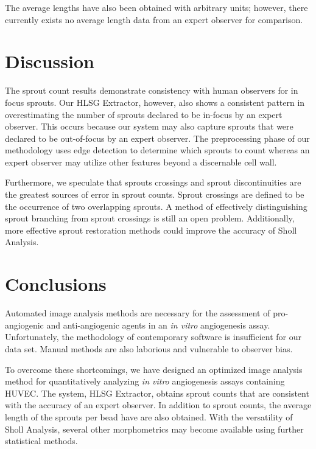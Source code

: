 \documentclass{sig-alternate}
\newcommand{\invitro}{\emph{in vitro} }
\begin{document}
	The average lengths have also been obtained with arbitrary units;
	however, there currently exists no average length data from an expert
	observer for comparison.

\section{Discussion} %
\label{sec:Discussion}
	The sprout count results demonstrate consistency with human observers
	for in focus sprouts. Our HLSG Extractor, however, also shows a
	consistent pattern in overestimating the number of sprouts
	declared to be in-focus by an expert observer. This occurs because
	our system may also capture sprouts that were declared to be
	out-of-focus by an expert observer. The preprocessing phase of our
	methodology uses edge detection to determine which sprouts to
	count whereas an expert observer may utilize other features beyond
	a discernable cell wall.

	Furthermore, we speculate that sprouts crossings and sprout
	discontinuities are the greatest sources of error in sprout counts.
	Sprout crossings are defined to be the occurrence of two overlapping
	sprouts. A method of effectively distinguishing sprout branching from
	sprout crossings is still an open problem. Additionally, more
	effective sprout restoration methods could improve the accuracy of
	Sholl Analysis.

\section{Conclusions} %
\label{sec:Conclusions}
	Automated image analysis methods are necessary for the assessment of
	pro-angiogenic and anti-angiogenic agents in an \invitro angiogenesis
	assay. Unfortunately, the methodology of contemporary software is
	insufficient for our data set. Manual methods are also laborious and
	vulnerable to observer bias.

	To overcome these shortcomings, we have designed an optimized image
	analysis method for quantitatively analyzing \invitro angiogenesis
	assays containing HUVEC. The system, HLSG Extractor, obtains sprout
	counts that are consistent with the accuracy of an expert observer. In
	addition to sprout counts, the average length of the sprouts per bead
	have are also obtained. With the versatility of Sholl Analysis,
	several other morphometrics may become available using further
	statistical methods.
\end{document}
